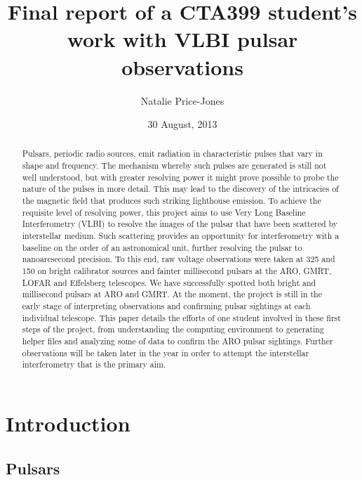 \documentclass[a4paper,12pt]{article}
\begin{document}
\onehalfspacing
\title{Final report of a CTA399 student's work with VLBI pulsar observations}
\author{Natalie Price-Jones}
\date{30 August, 2013}
\maketitle

\begin{abstract}
\label{abstract}


Pulsars, periodic radio sources, emit radiation in characteristic pulses that vary in shape and frequency. The mechanism whereby such pulses are generated is still not well understood, but with greater resolving power it might prove possible to probe the nature of the pulses in more detail. This may lead to the discovery of the intricacies of the magnetic field that produces such striking lighthouse emission. To achieve the requisite level of resolving power, this project aims to use Very Long Baseline Interferometry (VLBI) to resolve the images of the pulsar that have been scattered by interstellar medium. Such scattering provides an opportunity for interferometry with a baseline on the order of an astronomical unit, further resolving the pulsar to nanoarcsecond precision. To this end, raw voltage observations were taken at \unit{325}{\mega\hertz} and \unit{150}{\mega\hertz} on bright calibrator sources and fainter millisecond pulsars at the ARO, GMRT, LOFAR and Effelsberg telescopes. We have successfully spotted both bright and millisecond pulsars at ARO and GMRT. At the moment, the project is still in the early stage of interpreting observations and confirming pulsar sightings at each individual telescope. This paper details the efforts of one student involved in these first steps of the project, from understanding the computing environment to generating helper files and analyzing some of data to confirm the ARO pulsar sightings. Further observations will be taken later in the year in order to attempt the interstellar interferometry that is the primary aim.  

\end{abstract}

\section{Introduction}
\label{sec:introduction}

\subsection{Pulsars}
\label{sec:pulsars}
\end{document}
